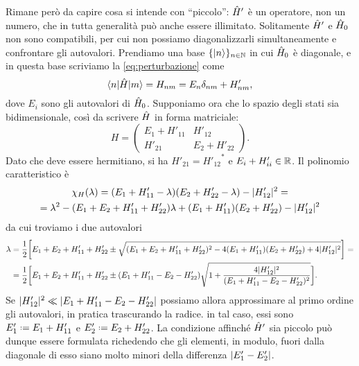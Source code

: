 Rimane però da capire cosa si intende con ``piccolo'': $\hat{H}'$ è un operatore, non un numero, che in tutta generalità può anche essere illimitato.
Solitamente $\hat{H}'$ e $\hat{H}_0$ non sono compatibili, per cui non possiamo diagonalizzarli simultaneamente e confrontare gli autovalori.
Prendiamo una base $\{\lvert n\rangle\}_{n\in\mathbb{N}}$ in cui $\hat{H}_0$ è diagonale, e in questa base scriviamo la \eqref{eq:perturbazione} come
\begin{equation}
	\langle n\rvert\hat{H}\lvert m\rangle=H_{nm}=E_n\delta_{nm}+H'_{nm},
	\label{eq:perturbazione-base}
\end{equation}
dove $E_i$ sono gli autovalori di $\hat{H}_0$.
Supponiamo ora che lo spazio degli stati sia bidimensionale, cos\`i da scrivere $\hat{H}$ in forma matriciale:
\begin{equation}
	H=
	\begin{pmatrix}
		E_1+H'_{11}	&H'_{12}\\
		H'_{21}		&E_2+H'_{22}
	\end{pmatrix}.
\end{equation}
Dato che deve essere hermitiano, si ha $H'_{21}={H'_{12}}^*$ e $E_i+H'_{ii}\in\mathbb{R}$.
Il polinomio caratteristico è
\begin{multline}
	\chi_H(\lambda)=(E_1+H_{11}'-\lambda)(E_2+H'_{22}-\lambda)-\lvert H'_{12}\rvert^2=\\
	=\lambda^2-(E_1+E_2+H'_{11}+H'_{22})\lambda+(E_1+H'_{11})(E_2+H'_{22})-\lvert H'_{12}\rvert^2
	\label{eq:polinomio-caratteristico-H-perturbato-2d}
\end{multline}
da cui troviamo i due autovalori
\begin{equation}
	\begin{split}
		\lambda
		&=\frac12\bigg[E_1+E_2+H'_{11}+H'_{22}\pm\sqrt{(E_1+E_2+H'_{11}+H'_{22})^2-4(E_1+H'_{11})(E_2+H'_{22})+4\lvert H'_{12}\rvert^2}\bigg]=\\
		&=\frac12\bigg[E_1+E_2+H'_{11}+H'_{22}\pm(E_1+H'_{11}-E_2-H'_{22})\sqrt{1+\frac{4\lvert H'_{12}\rvert^2}{(E_1+H'_{11}-E_2-H'_{22})^2}}\bigg].
	\end{split}
	\label{eq:autovalori-H-perturbato-2d}
\end{equation}
Se $\lvert H'_{12}\rvert^2\ll\lvert E_1+H'_{11}-E_2-H'_{22}\rvert$ possiamo allora approssimare al primo ordine gli autovalori, in pratica trascurando la radice.
in tal caso, essi sono $E'_1\defeq E_1+H'_{11}$ e $E'_2\defeq E_2+H'_{22}$.
La condizione affinch\'e $\hat{H}'$ sia piccolo può dunque essere formulata richedendo che gli elementi, in modulo, fuori dalla diagonale di esso siano molto minori della differenza $\lvert E'_1-E'_2\rvert$.
